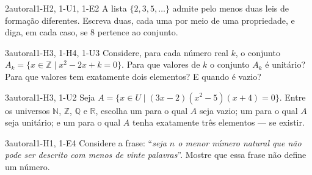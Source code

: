 \begin{questao}{2}{autoral}{1-H2, 1-U1, 1-E2}\label{u1:reticencias}
A lista $\{2,3,5,\ldots\}$ admite pelo menos duas leis de formação diferentes. Escreva duas, cada uma por meio de uma propriedade, e diga, em cada caso, se 8 pertence ao conjunto.
\end{questao}

\begin{questao}[integradora]{3}{autoral}{1-H3, 1-H4, 1-U3}\label{u1:parametro}
Considere, para cada número real $k$, o conjunto $A_k=\{x\in\mathbb{Z}\mid x^2-2x+k=0\}$. Para que valores de $k$ o conjunto $A_k$ é unitário? Para que valores tem exatamente dois elementos? E quando é vazio?
\end{questao}

\begin{questao}{3}{autoral}{1-H3, 1-U2}\label{u1:escolherU}
Seja $A=\{x\in U\mid (3x-2)(x^2-5)(x+4)=0\}$. Entre os universos $\mathbb{N}$, $\mathbb{Z}$, $\mathbb{Q}$ e $\mathbb{R}$, escolha um para o qual $A$ seja vazio; um para o qual $A$ seja unitário; e um para o qual $A$ tenha exatamente três elementos — se existir.
\end{questao}

\begin{questao}{3}{autoral}{1-H1, 1-E4}\label{u1:berry}
Considere a frase: \enquote{\emph{seja $n$ o menor número natural que não pode ser descrito com menos de vinte palavras}}. Mostre que essa frase não define um número.
\end{questao}

